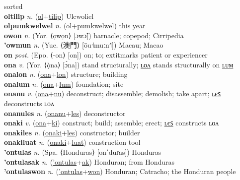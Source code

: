 sorted \label{oltokilum} \\
\textbf{oltilip} \textit{n.} (\hyperref[ol]{ol}+\hyperref[tilip]{tilip})
Ulcwoliel \label{oltilip} \\
\textbf{olpumkwelwel} \textit{n.} (\hyperref[ol]{ol}+\hyperref[pumkwelwel]{pumkwelwel})
this year \label{olpumkwelwel} \\
\textbf{owon} \textit{n.} (Yor. ⟨ọwọn⟩ [ɔwɔ̃])
barnacle; copepod; Cirripedia \label{owon} \\
\textbf{'owmun} \textit{n.} (Yue. ⟨澳門⟩ [ōu˧muːn˧˥])
Macau; Macao \label{'owmun} \\
\textbf{on} \textit{post.} (Epo. ⟨-on⟩ [on])
on; to; 	extit{marks patient or experiencer} \label{on} \\
\textbf{ona} \textit{v.} (Yor. ⟨ọ̀na⟩ [ɔ̀na])
stand structurally; \hyperref[onalon]{ʟᴏᴧ} stands structurally on \hyperref[onalum]{ʟᴜᴍ} \label{ona} \\
\textbf{onalon} \textit{n.} (\hyperref[ona]{ona}+\hyperref[lon]{lon})
structure; building \label{onalon} \\
\textbf{onalum} \textit{n.} (\hyperref[ona]{ona}+\hyperref[lum]{lum})
foundation; site \label{onalum} \\
\textbf{onanu} \textit{v.} (\hyperref[ona]{ona}+\hyperref[nu]{nu})
deconstruct; disassemble; demolish; take apart; \hyperref[onanules]{ʟєꜱ} deconstructs ʟᴏᴧ \label{onanu} \\
\textbf{onanules} \textit{n.} (\hyperref[onanu]{onanu}+\hyperref[les]{les})
deconstructor \label{onanules} \\
\textbf{onaki} \textit{v.} (\hyperref[ona]{ona}+\hyperref[ki]{ki})
construct; build; assemble; erect; \hyperref[onakiles]{ʟєꜱ} constructs ʟᴏᴧ \label{onaki} \\
\textbf{onakiles} \textit{n.} (\hyperref[onaki]{onaki}+\hyperref[les]{les})
constructor; builder \label{onakiles} \\
\textbf{onakiluat} \textit{n.} (\hyperref[onaki]{onaki}+\hyperref[luat]{luat})
construction tool \label{onakiluat} \\
\textbf{'ontulas} \textit{n.} (Spa. ⟨Honduras⟩ [onˈduɾas])
Honduras \label{'ontulas} \\
\textbf{'ontulasak} \textit{n.} (\hyperref['ontulas]{'ontulas}+\hyperref[ak]{ak})
Honduran; from Honduras \label{'ontulasak} \\
\textbf{'ontulaswon} \textit{n.} (\hyperref['ontulas]{'ontulas}+\hyperref[won]{won})
Honduran; Catracho; the Honduran people \label{'ontulaswon} \\
